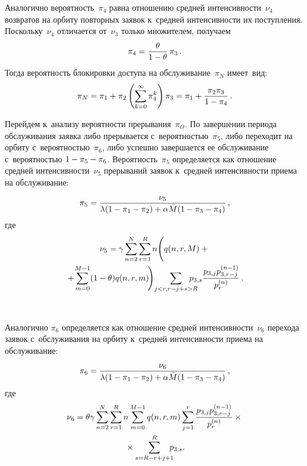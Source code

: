 \begin{multicols}{2}
Аналогично вероятность~$\pi_4$ рав\-на отношению сред\-ней ин\-тен\-сив\-ности~$\nu_4$ 
возвратов на орбиту по\-втор\-ных заявок к~средней ин\-тен\-сив\-ности их по\-ступ\-ле\-ния. 
Поскольку~$\nu_4$ отличается от~$\nu_3$ только множителем, получаем 
$$
\pi_4=\displaystyle\frac{\displaystyle \theta\mathstrut}{\displaystyle 1-\theta\mathstrut}\, \pi_3\,.
$$
Тогда ве\-ро\-ят\-ность блокировки до\-сту\-па на обслуживание~$\pi_N$ име\-ет~вид:
\begin{equation*} 
    \pi_N=\pi_1 + \pi_2 \left( \sum\limits_{k=0}^{\infty} \pi_4^k \right) 
\pi_3=\pi_1+\displaystyle\frac{\displaystyle \pi_2 \pi_3\mathstrut}{\displaystyle 1-\pi_4\mathstrut}\,.
\end{equation*}

Перейдем к~анализу ве\-ро\-ят\-ности прерывания~$\pi_O$. По завершении периода 
обслуживания заявка либо прерывается с~ве\-ро\-ят\-ностью~$\pi_5$, либо переходит на 
орбиту с~ве\-ро\-ят\-ностью~$\pi_6$, либо успешно завершается ее обслуживание 
с~ве\-ро\-ят\-ностью $1\hm-\pi_5\hm- \pi_6$.  Ве\-ро\-ят\-ность~$\pi_{5}$ определяется как отношение 
средней ин\-тен\-сив\-ности~$\nu_5$ прерываний заявок к~сред\-ней ин\-тен\-сив\-ности приема 
на обслуживание:
$$
\pi_5=\fr{\nu_5}{\lambda(1-\pi_1-\pi_2)+ \alpha \bar{M} (1- \pi_3\hm-\pi_4)}\,,
$$
 где
\begin{multline*}
   \nu_5=\gamma \sum\limits_{n=2}^N \sum\limits_{r=1}^R n \Bigg( q(n,r,M) + {}\\
   {}+\!
\sum\limits_{m=0}^{M-1} (1-\theta)q(n,r,m) \! \Bigg)\! \sum\limits_{j<r, r-j+s>R} \!\!\!\!\!\!\! p_{3,s} \fr{p_{3,j} p_{3,r-j}^{(n-1)}}{p_r^{(n)}} \,.
\end{multline*}

\begin{figure*}[b] %
 \vspace*{6pt}
\begin{center}
   \mbox{%
\epsfxsize=163mm 
}
\end{center}
\vspace*{-9pt}
\label{fig:basic}
\end{figure*}


Аналогично $\pi_6$ определяется как отношение сред\-ней ин\-тен\-сив\-ности~$\nu_6$ 
перехода заявок с~обслуживания на орбиту к~сред\-ней ин\-тен\-сив\-ности приема на 
обслуживание:
$$
\pi_6=\fr{\nu_6}{\lambda(1\hm-\pi_1\hm-\pi_2) \hm+ \alpha \bar{M} (1\hm-
\pi_3\hm-\pi_4)}\,,
$$
 где
\begin{multline*}
   \nu_6=\theta \gamma \sum\limits_{n=2}^N \sum\limits_{r=1}^R n \sum\limits_{m=0}^{M-1} q(n,r,m) 
\sum\limits_{j=1}^r \displaystyle\frac{\displaystyle p_{3,j} p_{3,r-j}^{(n-1)}\mathstrut}{\displaystyle p_r^{(n)}\mathstrut} \times{}\\
{}\times \sum\limits_{s=R-r+j+1}^R \!\!\!\! 
p_{3,s}.
\end{multline*}



\end{multicols}
